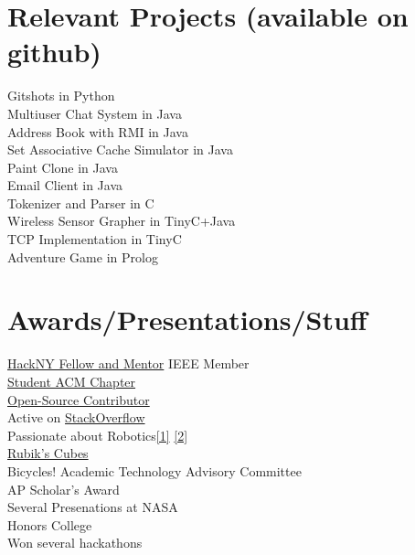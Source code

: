 \documentclass[10pt]{article}
\begin{document}
\begin{minipage}[t]{0.44\textwidth}
\section{Relevant Projects (available on github)}
   Gitshots in Python\\
   Multiuser Chat System in Java\\
   Address Book with RMI in Java\\
   Set Associative Cache Simulator in Java\\
   Paint Clone in Java\\
   Email Client in Java\\
   Tokenizer and Parser in C\\
   Wireless Sensor Grapher in TinyC+Java\\
   TCP Implementation in TinyC\\
   Adventure Game in Prolog\\

\section{Awards/Presentations/Stuff}
   \href{http://hackny.org/a/about/}{HackNY Fellow and Mentor}
   IEEE Member\\
   \href{http://polaris.cs.wcu.edu/~acm/}{Student ACM Chapter}\\
   \href{https://github.com/ranman}{Open-Source Contributor}\\
   Active on \href{http://stackoverflow.com/users/240004/ranman}
   {StackOverflow}\\
   Passionate about Robotics\href{http://robotics.punahou.edu/}{[1]}
   \href{http://irg.arc.nasa.gov}{[2]}\\
   \href{http://www.youtube.com/user/ranman96734}{Rubik's Cubes}\\
   Bicycles!
   Academic Technology Advisory Committee\\
   AP Scholar's Award\\
   Several Presenations at NASA\\
   Honors College\\
   Won several hackathons\\
\end{minipage}
\end{document}
